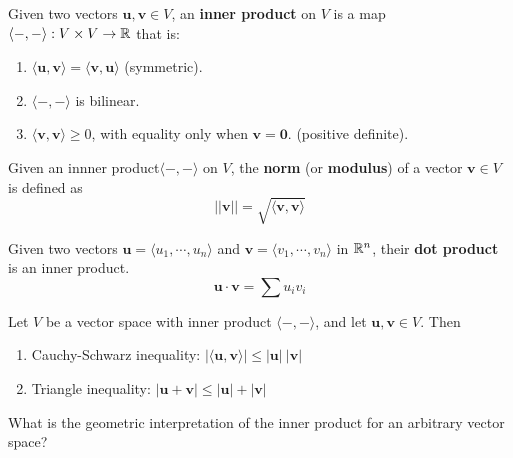 \begin{definition}
    
    Given two vectors $\bm{u},\bm{v} \in V$, an \textbf{inner product} on $V$ is a map $\langle - , - \rangle :  V \times V \to \mathbb{R}$ that is:
    \vspace{1em}
    
    \begin{enumerate}
        \item $\langle \bm{u}, \bm{v} \rangle = \langle \bm{v}, \bm{u} \rangle$ (symmetric).
        \item $\langle - , - \rangle$ is bilinear.
        \item $\langle \bm{v}, \bm{v} \rangle \geq 0$, with equality only when $\bm{v} = \bm{0}$. (positive definite).  
    \end{enumerate}
    
    \end{definition}

\begin{definition}
    Given an innner product$\langle - , - \rangle$ on $V$, the \textbf{norm} (or \textbf{modulus}) of a vector $\bm{v} \in V$ is defined as $$||\bm{v}|| = \sqrt{\langle \bm{v}, \bm{v}\rangle}$$
    \end{definition}
    

\begin{example}
    Given two vectors $\bm{u} = \langle u_1, \cdots, u_n \rangle$ and $\bm{v}  = \langle v_1 , \cdots, v_n \rangle$ in $\mathbb{R}^n$, their \textbf{dot product} is an inner product. $$\bm{u} \cdot \bm{v} = \sum u_iv_i$$
    \end{example}

\begin{theorem}
    Let $V$ be a vector space with inner product $\langle - , - \rangle$, and let $\bm{u}, \bm{v} \in V$.  Then
    \begin{enumerate}
        \item Cauchy-Schwarz inequality: $| \langle \bm{u},\bm{v} \rangle | \leq  | \bm{u}| \ | \bm{v} |$
        \item Triangle inequality: $| \bm{u}+ \bm{v} | \leq  | \bm{u}| +| \bm{v} |$
    \end{enumerate}
    
    \end{theorem}





\begin{motivating}
What is the geometric interpretation of the inner product for an arbitrary vector space?
\end{motivating}

